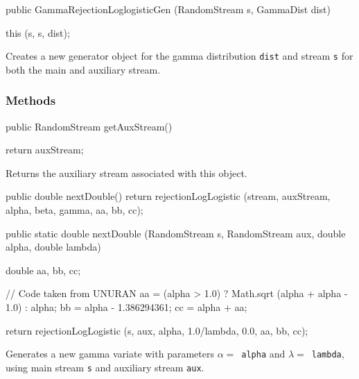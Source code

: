 \begin{code}

   public GammaRejectionLoglogisticGen (RandomStream s, GammaDist dist) \begin{hide} {
      this (s, s, dist);
   }\end{hide}
\end{code}
  \begin{tabb}  Creates a new generator object for the gamma
    distribution \texttt{dist} and  stream \texttt{s} for both the main and
    auxiliary stream.
  \end{tabb}

\subsubsection* {Methods}
\begin{code}

   public RandomStream getAuxStream()\begin{hide} {
      return auxStream;
   }\end{hide}
\end{code}
\begin{tabb}   Returns the auxiliary stream associated with this object.
\end{tabb}
\begin{code}\begin{hide}

   public double nextDouble() {
      return rejectionLogLogistic 
                      (stream, auxStream, alpha, beta, gamma, aa, bb, cc);
   }\end{hide}

   public static double nextDouble (RandomStream s, RandomStream aux, 
                                    double alpha, double lambda)\begin{hide} {
      double aa, bb, cc;

      // Code taken from UNURAN
      aa = (alpha > 1.0) ? Math.sqrt (alpha + alpha - 1.0) : alpha;
      bb = alpha - 1.386294361;
      cc = alpha + aa;
    
      return rejectionLogLogistic (s, aux, alpha, 1.0/lambda, 0.0, aa, bb, cc);
   }\end{hide}
\end{code}
 \begin{tabb} Generates a new gamma variate with parameters
  $\alpha = $~\texttt{alpha} and $\lambda = $~\texttt{lambda}, using
  main stream \texttt{s} and auxiliary stream \texttt{aux}.
 \end{tabb}

